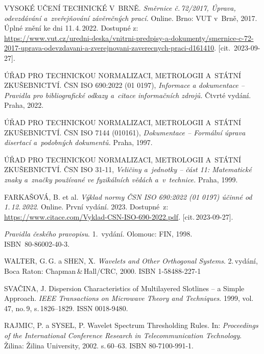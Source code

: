 

\begin{thebibliography}{99}
	
	VYSOKÉ UČENÍ TECHNICKÉ V~BRNĚ.
	\emph{Směrnice č.\,72/2017, Úprava, odevzdávání a~zveřejňování závěrečných prací.}
	Online. Brno: VUT v~Brně, 2017.
	Úplné znění ke dni 11.\,4.\,2022.
	Dostupné z:\\
	{\small
	\url{https://www.vut.cz/uredni-deska/vnitrni-predpisy-a-dokumenty/smernice-c-72-2017-uprava-odevzdavani-a-zverejnovani-zaverecnych-praci-d161410}.}
	[cit.\ 2023-09-27].

    ÚŘAD PRO TECHNICKOU NORMALIZACI, METROLOGII A~STÁTNÍ ZKUŠEBNICTVÍ.
    ČSN ISO 690:2022 (01 0197), \emph{Informace a dokumentace -- Pravidla pro bibliografické odkazy a~citace informačních zdrojů.}
    Čtvrté vydání. Praha, 2022.

    ÚŘAD PRO TECHNICKOU NORMALIZACI, METROLOGII A~STÁTNÍ ZKUŠEBNICTVÍ.
    ČSN ISO 7144 (010161), \emph{Dokumentace -- Formální úprava disertací a~podobných dokumentů.}
    Praha, 1997.

    ÚŘAD PRO TECHNICKOU NORMALIZACI, METROLOGII A~STÁTNÍ ZKUŠEBNICTVÍ.
    ČSN ISO 31-11, \emph{Veličiny a~jednotky -- část 11: Matematické znaky a~značky používané ve fyzikálních vědách a~v~technice.}
    Praha, 1999.

	FARKAŠOVÁ, B. et al.
	\emph{Výklad normy ČSN ISO 690:2022 (01 0197) účinné od 1.\,12.\,2022}.
	 Online. První vydání. 2023.
	Dostupné~z:
	\url{https://www.citace.com/Vyklad-CSN-ISO-690-2022.pdf}.
	[cit.\,2023-09-27].

    \emph{Pravidla českého pravopisu}.
	1.\ vydání. Olomouc: FIN, 1998.\\
	\mbox{ISBN 80-86002-40-3}.

	WALTER, G.\,G. a SHEN, X.
	\emph{Wavelets and Other Orthogonal Systems}.
	2.\,vydání, Boca Raton: Chapman\,\&\,Hall/CRC, 2000.
	ISBN 1-58488-227-1

	SVAČINA, J.
	Dispersion Characteristics of Multilayered Slotlines -- a Simple Approach.
	\emph{IEEE Transactions on Microwave Theory and Techniques}.
	1999, vol.\,47, no.\,9, s.\,1826--1829. ISSN 0018-9480.

    RAJMIC, P. a SYSEL, P.
    Wavelet Spectrum Thresholding Rules.
    In: \emph{Proceedings of the International Conference Research in Telecommunication Technology}.
    Žilina: Žilina University, 2002. s.\,60--63. ISBN 80-7100-991-1.

\end{thebibliography}


